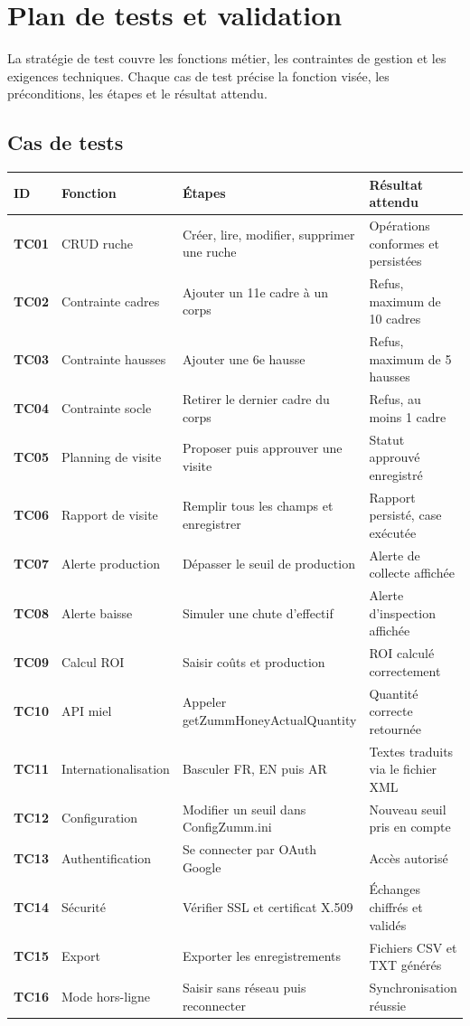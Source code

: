\chapter{Plan de tests et validation}
La stratégie de test couvre les fonctions métier, les contraintes de gestion et
les exigences techniques. Chaque cas de test précise la fonction visée, les
préconditions, les étapes et le résultat attendu.

\section{Cas de tests}
\begin{xltabular}{\textwidth}{>{\bfseries}p{1.4cm} p{3.6cm} p{4.2cm} X}
\toprule
\textbf{ID} & \textbf{Fonction} & \textbf{Étapes} & \textbf{Résultat attendu} \\
\midrule
\endhead
TC01 & CRUD ruche & Créer, lire, modifier, supprimer une ruche & Opérations conformes et persistées \\
TC02 & Contrainte cadres & Ajouter un 11e cadre à un corps & Refus, maximum de 10 cadres \\
TC03 & Contrainte hausses & Ajouter une 6e hausse & Refus, maximum de 5 hausses \\
TC04 & Contrainte socle & Retirer le dernier cadre du corps & Refus, au moins 1 cadre \\
TC05 & Planning de visite & Proposer puis approuver une visite & Statut approuvé enregistré \\
TC06 & Rapport de visite & Remplir tous les champs et enregistrer & Rapport persisté, case exécutée \\
TC07 & Alerte production & Dépasser le seuil de production & Alerte de collecte affichée \\
TC08 & Alerte baisse & Simuler une chute d'effectif & Alerte d'inspection affichée \\
TC09 & Calcul ROI & Saisir coûts et production & ROI calculé correctement \\
TC10 & API miel & Appeler getZummHoneyActualQuantity & Quantité correcte retournée \\
TC11 & Internationalisation & Basculer FR, EN puis AR & Textes traduits via le fichier XML \\
TC12 & Configuration & Modifier un seuil dans ConfigZumm.ini & Nouveau seuil pris en compte \\
TC13 & Authentification & Se connecter par OAuth Google & Accès autorisé \\
TC14 & Sécurité & Vérifier SSL et certificat X.509 & Échanges chiffrés et validés \\
TC15 & Export & Exporter les enregistrements & Fichiers CSV et TXT générés \\
TC16 & Mode hors-ligne & Saisir sans réseau puis reconnecter & Synchronisation réussie \\
\bottomrule
\end{xltabular}

